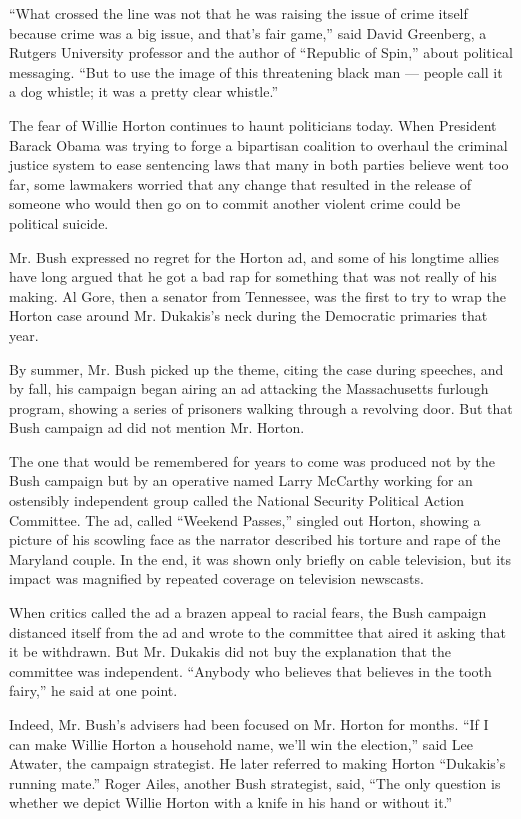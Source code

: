 ``What crossed the line was not that he was raising the issue of crime
itself because crime was a big issue, and that's fair game,'' said David
Greenberg, a Rutgers University professor and the author of ``Republic
of Spin,'' about political messaging. ``But to use the image of this
threatening black man --- people call it a dog whistle; it was a pretty
clear whistle.''

The fear of Willie Horton continues to haunt politicians today. When
President Barack Obama was trying to forge a bipartisan coalition to
overhaul the criminal justice system to ease sentencing laws that many
in both parties believe went too far, some lawmakers worried that any
change that resulted in the release of someone who would then go on to
commit another violent crime could be political suicide.

Mr. Bush expressed no regret for the Horton ad, and some of his longtime
allies have long argued that he got a bad rap for something that was not
really of his making. Al Gore, then a senator from Tennessee, was the
first to try to wrap the Horton case around Mr. Dukakis's neck during
the Democratic primaries that year.

By summer, Mr. Bush picked up the theme, citing the case during
speeches, and by fall, his campaign began airing an ad attacking the
Massachusetts furlough program, showing a series of prisoners walking
through a revolving door. But that Bush campaign ad did not mention Mr.
Horton.

The one that would be remembered for years to come was produced not by
the Bush campaign but by an operative named Larry McCarthy working for
an ostensibly independent group called the National Security Political
Action Committee. The ad, called ``Weekend Passes,'' singled out Horton,
showing a picture of his scowling face as the narrator described his
torture and rape of the Maryland couple. In the end, it was shown only
briefly on cable television, but its impact was magnified by repeated
coverage on television newscasts.

When critics called the ad a brazen appeal to racial fears, the Bush
campaign distanced itself from the ad and wrote to the committee that
aired it asking that it be withdrawn. But Mr. Dukakis did not buy the
explanation that the committee was independent. ``Anybody who believes
that believes in the tooth fairy,'' he said at one point.

Indeed, Mr. Bush's advisers had been focused on Mr. Horton for months.
``If I can make Willie Horton a household name, we'll win the
election,'' said Lee Atwater, the campaign strategist. He later referred
to making Horton ``Dukakis's running mate.'' Roger Ailes, another Bush
strategist, said, ``The only question is whether we depict Willie Horton
with a knife in his hand or without it.''


